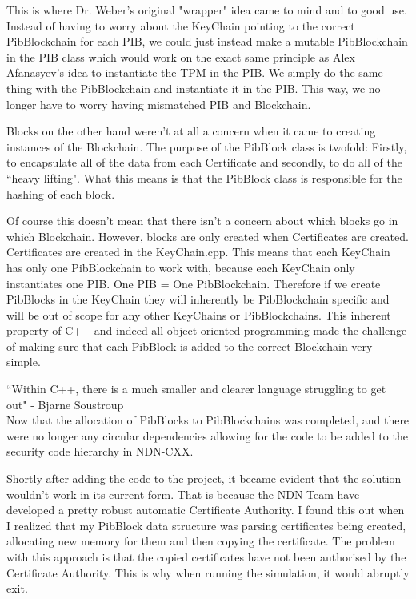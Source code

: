 This is where Dr. Weber's original "wrapper" idea came to mind and to good use. Instead of having to worry about the KeyChain pointing to the correct PibBlockchain for each PIB, we could just instead make a mutable PibBlockchain in the PIB class which would work on the exact same principle as Alex Afanasyev's idea to instantiate the TPM in the PIB. We simply do the same thing with the PibBlockchain and instantiate it in the PIB. This way, we no longer have to worry having mismatched PIB and Blockchain. 

Blocks on the other hand weren't at all a concern when it came to creating instances of the Blockchain. The purpose of the PibBlock class is twofold: Firstly, to encapsulate all of the data from each Certificate and secondly, to do all of the ``heavy lifting". What this means is that the PibBlock class is responsible for the hashing of each block. 

Of course this doesn't mean that there isn't a concern about which blocks go in which Blockchain. However, blocks are only created when Certificates are created. Certificates are created in the KeyChain.cpp. This means that each KeyChain has only one PibBlockchain to work with, because each KeyChain only instantiates one PIB. One PIB = One PibBlockchain. Therefore if we create PibBlocks in the KeyChain they will inherently be PibBlockchain specific and will be out of scope for any other KeyChains or PibBlockchains. This inherent property of C++ and indeed all object oriented programming made the challenge of making sure that each PibBlock is added to the correct Blockchain very simple.

``Within C++, there is a much smaller and clearer language struggling to get out" - Bjarne Soustroup\cite{050}
\\


Now that the allocation of PibBlocks to PibBlockchains was completed, and there were no longer any circular dependencies allowing for the code to be added to the security code hierarchy in NDN-CXX. \par 

Shortly after adding the code to the project, it became evident that the solution wouldn't work in its current form. That is because the NDN Team have developed a pretty robust automatic Certificate Authority. I found this out when I realized that my PibBlock data structure was parsing certificates being created, allocating new memory for them and then copying the certificate. The problem with this approach is that the copied certificates have not been authorised by the Certificate Authority. This is why when running the simulation, it would abruptly exit. 

